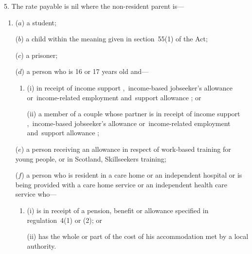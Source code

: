 \documentclass[12pt,a4paper]{article}
\begin{document}
5.  The rate payable is nil where the non-resident parent is—
\begin{enumerate}\item[]
($a$) a student;

($b$) a child within the meaning given in section~55(1) of the Act;

($c$) a prisoner;

($d$) a person who is 16 or 17 years old and—
\begin{enumerate}\item[]
(i) in receipt of income support%
,~income-based jobseeker’s allowance or~income-related employment and~support allowance%
; or

(ii) a member of a couple whose partner is in receipt of income support%
,~income-based jobseeker’s allowance or~income-related employment and~support allowance%
;
\end{enumerate}

($e$) a person receiving an allowance in respect of work-based training for young people, or in Scotland, Skillseekers training;

($f$) a person 
who is resident in a care home or an independent hospital or is being provided with a care home service or an independent health care service  %
who—
\begin{enumerate}\item[]
(i) is in receipt of a pension, benefit or allowance specified in regulation~4(1) or (2); or

(ii) has the whole or part of the cost of his accommodation met by a local authority.
\end{enumerate}


\end{enumerate}
\end{document}
